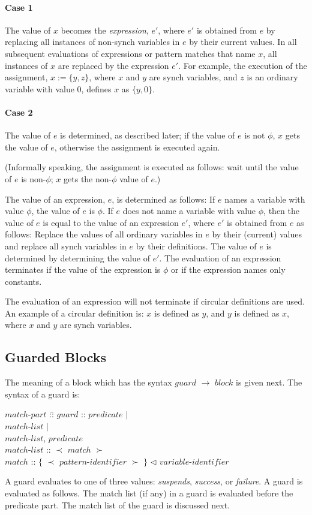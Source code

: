 \paragraph{Case 1}
The value of $x$ becomes the {\em expression}, $e'$,
where $e'$ is obtained from $e$ by replacing all instances of non-synch
variables in $e$ by their current values.
In all subsequent evaluations of expressions or pattern matches that name
$x$, all instances of $x$ are replaced by the expression $e'$.
For example, the execution of the assignment, $x := \{y,z\}$, where $x$ and $y$ 
are synch variables, and $z$ is an ordinary variable with value $0$,
defines $x$ as $\{y,0\}$.

\paragraph{Case 2}
The value of $e$ is determined, as described later;
if the value of $e$ is not $\phi$,
$x$ gets the value of $e$, 
otherwise the assignment is executed again.

(Informally speaking, the assignment is executed as follows: wait until
the value of $e$ is non-$\phi$;  $x$ gets the non-$\phi$ value of $e$.)

The value of an expression, $e$, is determined as follows: 
If $e$ names a variable with value $\phi$, the value
of $e$ is  $\phi$.
If $e$ does not name a variable with value $\phi$, then 
the value of $e$ is equal to the value of an expression $e'$,
where $e'$ is obtained from $e$ as follows: Replace the values
of all ordinary variables in $e$ by their (current) values and
replace all synch variables in $e$ by their definitions.
The value of $e$ is determined by determining the value of $e'$.
The evaluation of an expression terminates if the value of the
expression is $\phi$
or if the expression names only constants.

The evaluation of an expression will not terminate if circular 
definitions are used. An example of a circular definition is:
 $x$ is defined as $y$, and $y$ is
defined as $x$, where $x$ and $y$ are synch variables.


\subsection{Guarded Blocks}
The meaning of a block which has the syntax $guard$ $\rightarrow$ $block$ is
given next.
The syntax of a guard is: \\
\begin{tabbing}
$match$-$part$ ::\=  \kill
$guard$ :: \> $predicate$ $|$ \\
           \> $match$-$list$ $|$ \\
           \> $match$-$list$, $predicate$ \\
$match$-$list$ :: \> $\prec$ $match$ $\succ$  \\        
$match$ :: \> $\{$ $\prec$ $pattern$-$identifier$ $\succ$ $\}$
$\lhd$ $variable$-$identifier$
\end{tabbing}
A guard evaluates to one of three values: {\em suspends}, {\em success},
or {\em failure}. A guard is evaluated as follows.
The match list (if any) in a guard is evaluated
before the predicate part. The match list of the guard is discussed
next.


